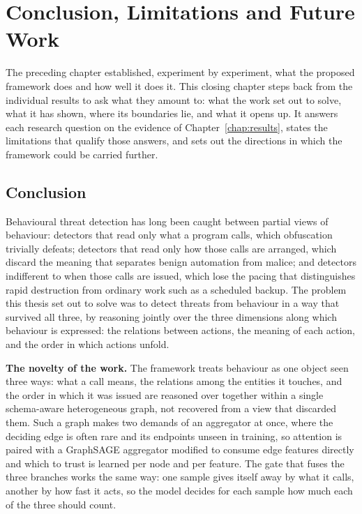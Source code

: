 \documentclass[%
    BCOR=10mm,
    DIV=13,
    toc=bibliography,
    toc=listof,
    oneside,
    12pt,
]{scrbook}
\begin{document}
\chapter{Conclusion, Limitations and Future Work}
\label{chap:future_work}

The preceding chapter established, experiment by experiment, what the proposed
framework does and how well it does it. This closing chapter steps back from the
individual results to ask what they amount to: what the work set out to solve, what
it has shown, where its boundaries lie, and what it opens up. It answers each
research question on the evidence of Chapter~\ref{chap:results}, states the
limitations that qualify those answers, and sets out the directions in which the
framework could be carried further.

\section{Conclusion}
\label{sec:conclusion}

Behavioural threat detection has long been caught between partial views of behaviour:
detectors that read only what a program calls, which obfuscation trivially defeats;
detectors that read only how those calls are arranged, which discard the meaning that
separates benign automation from malice; and detectors indifferent to when those
calls are issued, which lose the pacing that distinguishes rapid destruction from
ordinary work such as a scheduled backup. The problem this thesis set out to
solve was to detect threats from behaviour in a way that survived all three, by
reasoning
jointly over the three dimensions along which behaviour is expressed: the relations
between actions, the meaning of each action, and the order in which actions unfold.

\textbf{The novelty of the work.} The framework treats behaviour as one object
seen three ways: what a call means, the relations among the entities it touches,
and the order in which it was issued are reasoned over together within a single
schema-aware heterogeneous graph, not recovered from a view that discarded them.
Such a graph makes two demands of an aggregator at once, where the deciding edge is
often rare and its endpoints unseen in training, so attention is paired with a
GraphSAGE aggregator modified to consume edge features directly and which to trust
is learned per node and per feature. The gate that fuses the three branches works
the same way: one sample gives itself away by what it calls, another by how fast it
acts, so the model decides for each sample how much each of the three should
count.
\end{document}
